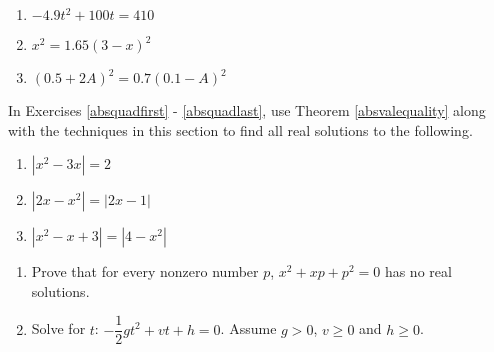 \documentclass{ximera}
\begin{document}
\begin{multicols}{3}
\begin{enumerate}
\setcounter{enumi}{\value{HW}}

\item $-4.9t^2 + 100t = 410$
\item $x^2 = 1.65(3-x)^2$
\item $(0.5+2A)^2 = 0.7(0.1-A)^2$ \label{solvequadcalclast}

\setcounter{HW}{\value{enumi}}
\end{enumerate}
\end{multicols}







In Exercises \ref{absquadfirst} - \ref{absquadlast}, use Theorem \ref{absvalequality} along with the techniques in this section to find all real solutions to the following.

\begin{multicols}{3}
\begin{enumerate}
\setcounter{enumi}{\value{HW}}

\item $|x^2 - 3x| = 2$ \label{absquadfirst}
\item $|2x-x^2| = |2x-1|$
\item $|x^2 -x + 3| = |4-x^2|$ \label{absquadlast}

\setcounter{HW}{\value{enumi}}
\end{enumerate}
\end{multicols}

\begin{enumerate}
\setcounter{enumi}{\value{HW}}

\item  Prove that for every nonzero number $p$, $x^2 + xp + p^2 = 0$  has no real solutions.

\item  Solve for $t$: $-\dfrac{1}{2} g t^2 + vt + h = 0$. Assume $g > 0$, $v \geq 0$ and $h \geq 0$.

\setcounter{HW}{\value{enumi}}
\end{enumerate}
\end{document}
